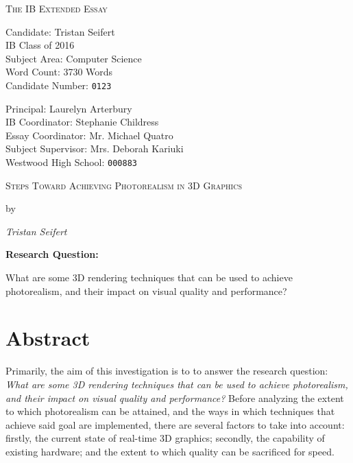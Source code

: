 \documentclass[11pt, oneside]{report}
\begin{document}
\begin{titlepage}
	{\centering\scshape\Huge The IB Extended Essay\par}
	\vspace{.66cm}
	
	\begin{minipage}[t]{0.48\textwidth}
		Candidate: Tristan Seifert \\
		IB Class of 2016 \\
		Subject Area: Computer Science \\
		Word Count: 3730 Words \\
		Candidate Number: \tt{0123}
	\end{minipage}
	\hfill
	\begin{minipage}[t]{0.48\textwidth}
		\begin{flushright}
			Principal: Laurelyn Arterbury \\
			IB Coordinator: Stephanie Childress \\
			Essay Coordinator: Mr. Michael Quatro \\
			Subject Supervisor: Mrs. Deborah Kariuki \\
			Westwood High School: \tt{000883}
		\end{flushright}
	\end{minipage}

	\centering
	\vspace{7.4cm}
	{\scshape\Large Steps Toward Achieving Photorealism in 3D Graphics\par}
	{by\par}
	{\itshape Tristan Seifert\par}
	\vspace{7.4cm}
	{\bfseries Research Question:}
	{What are some 3D rendering techniques that can be used to achieve photorealism, and their impact on visual quality and performance?\par}
	\vfill
\end{titlepage}

{
	\renewcommand{\addtocontents}[2]{}
	\chapter*{Abstract}
}

Primarily, the aim of this investigation is to to answer the research question: \textit{What are some 3D rendering techniques that can be used to achieve photorealism, and their impact on visual quality and performance?} Before analyzing the extent to which photorealism can be attained, and the ways in which techniques that achieve said goal are implemented, there are several factors to take into account: firstly, the current state of real-time 3D graphics; secondly, the capability of existing hardware; and the extent to which quality can be sacrificed for speed. 
\end{document}
